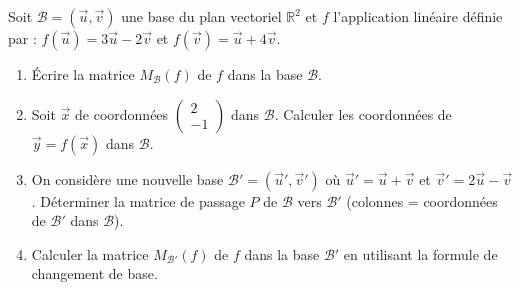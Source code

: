 \documentclass[11pt]{article}
\begin{document}
\begin{exercice}
Soit $\mathcal{B} = (\vec{u}, \vec{v})$ une base du plan vectoriel $\mathbb{R}^2$ et $f$ l'application linéaire définie par :
$f(\vec{u}) = 3\vec{u} - 2\vec{v}$ et $f(\vec{v}) = \vec{u} + 4\vec{v}$.
\begin{enumerate}
    \item Écrire la matrice $M_{\mathcal{B}}(f)$ de $f$ dans la base $\mathcal{B}$.
    \item Soit $\vec{x}$ de coordonnées $\begin{pmatrix} 2 \\ -1 \end{pmatrix}$ dans $\mathcal{B}$. Calculer les coordonnées de $\vec{y} = f(\vec{x})$ dans $\mathcal{B}$.
    \item On considère une nouvelle base $\mathcal{B}' = (\vec{u}', \vec{v}')$ où $\vec{u}' = \vec{u} + \vec{v}$ et $\vec{v}' = 2\vec{u} - \vec{v}$. 
    Déterminer la matrice de passage $P$ de $\mathcal{B}$ vers $\mathcal{B}'$ (colonnes = coordonnées de $\mathcal{B}'$ dans $\mathcal{B}$).
    \item Calculer la matrice $M_{\mathcal{B}'}(f)$ de $f$ dans la base $\mathcal{B}'$ en utilisant la formule de changement de base.
\end{enumerate}
\end{exercice}
\end{document}

